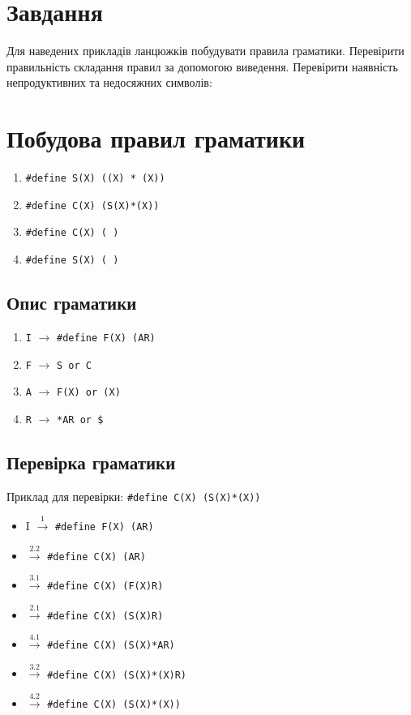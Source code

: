 \section{Завдання}
Для наведених прикладів ланцюжків побудувати правила граматики.
Перевірити правильність складання правил за допомогою виведення.
Перевірити наявність непродуктивних та недосяжних символів:


\section{Побудова правил граматики}
\begin{enumerate}
    \item \verb|#define S(X) ((X) * (X))|
    \item \verb|#define C(X) (S(X)*(X))|
    \item \verb|#define C(X) ( )|
    \item \verb|#define S(X) ( )|
\end{enumerate}

\subsection{Опис граматики}
\begin{enumerate}
    \item  \verb|I| $\to$ \verb|#define F(X) (AR)|
    \item  \verb|F| $\to$ \verb|S or C|
    \item  \verb|A| $\to$ \verb|F(X) or (X)|
    \item  \verb|R| $\to$ \verb|*AR or $|
\end{enumerate}

\newpage
\subsection{Перевірка граматики}
Приклад для перевірки: \verb|#define C(X) (S(X)*(X))|
\begin{itemize}
    \item[]  I $\xrightarrow{1}$ \verb|#define F(X) (AR)|
    \item[]  $\xrightarrow{2.2}$ \verb|#define C(X) (AR)|
    \item[]  $\xrightarrow{3.1}$ \verb|#define C(X) (F(X)R)|
    \item[]  $\xrightarrow{2.1}$ \verb|#define C(X) (S(X)R)|
    \item[]  $\xrightarrow{4.1}$ \verb|#define C(X) (S(X)*AR)|
    \item[]  $\xrightarrow{3.2}$ \verb|#define C(X) (S(X)*(X)R)|
    \item[]  $\xrightarrow{4.2}$ \verb|#define C(X) (S(X)*(X))|
\end{itemize}

